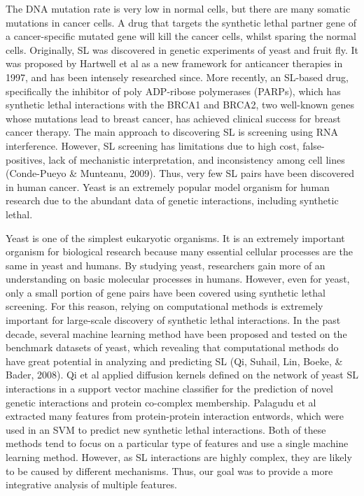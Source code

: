 The DNA mutation rate is very low in normal cells, but there are many somatic mutations in cancer cells. A drug that targets the synthetic lethal partner gene of a cancer-specific mutated gene will kill the cancer cells, whilst sparing the normal cells. Originally, SL was discovered in genetic experiments of yeast and fruit fly. It was proposed by Hartwell et al as a new framework for anticancer therapies in 1997, and has been intensely researched since. More recently, an SL-based drug, specifically the inhibitor of poly ADP-ribose polymerases (PARPs), which has synthetic lethal interactions with the BRCA1 and BRCA2, two well-known genes whose mutations lead to breast cancer, has achieved clinical success for breast cancer therapy. The main approach to discovering SL is screening using RNA interference. However, SL screening has limitations due to high cost, false-positives, lack of mechanistic interpretation, and inconsistency among cell lines (Conde-Pueyo \& Munteanu, 2009). Thus, very few SL pairs have been discovered in human cancer. Yeast is an extremely popular model organism for human research due to the abundant data of genetic interactions, including synthetic lethal. 

Yeast is one of the simplest eukaryotic organisms. It is an extremely important organism for biological research because many essential cellular processes are the same in yeast and humans. By studying yeast, researchers gain more of an understanding on basic molecular processes in humans. However, even for yeast, only a small portion of gene pairs have been covered using synthetic lethal screening. For this reason, relying on computational methods is extremely important for large-scale discovery of synthetic lethal interactions. In the past decade, several machine learning method have been proposed and tested on the benchmark datasets of yeast, which revealing that computational methods do have great potential in analyzing and predicting SL (Qi, Suhail, Lin, Boeke, \& Bader, 2008). Qi et al applied diffusion kernels defined on the network of yeast SL interactions in a support vector machine classifier for the prediction of novel genetic interactions and protein co-complex membership. Palagudu et al extracted many features from protein-protein interaction entwords, which were used in an SVM to predict new synthetic lethal interactions. Both of these methods tend to focus on a particular type of features and use a single machine learning method. However, as SL interactions are highly complex, they are likely to be caused by different mechanisms. Thus, our goal was to provide a more integrative analysis of multiple features.


